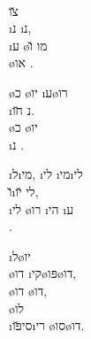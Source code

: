 
\begin{twocol}
\begin{stanza}
  \\
\u{צו}  \\
\i{נ} \i{נ},\\
\i{ע} \o{מו} \u{ו}\\
 \o{או} .
\end{stanza}

\begin{stanza}
\o{כ} \o{יו} \i{ע}\o{רו}  \\
\i{נ} \u{חו}.\\
\o{כ} \o{יו} \\
\i{נ} .
\end{stanza}

\begin{stanza}
\i{ל}\i{מי}, \i{לי} \i{מי}\i{לי}\\
\u{ו}\i{לי}  \u{יו},\\
\i{לי} \o{רו} \i{הי} \i{ע} \\
 .
\end{stanza}

\begin{stanza}
\i{ל}\o{יו}  \\
 \o{דו} \i{קי}\o{פּו}\o{דו},\\
\o{דו} \o{דו},\\
\o{לו}  \\
\i{סי}\u{פּו}\i{רי} \o{סו}\o{דו}.
\end{stanza}
\end{twocol}
